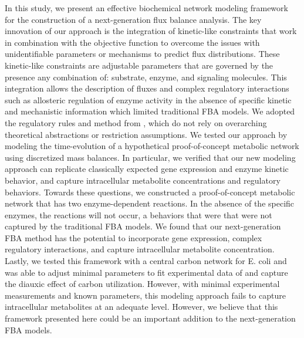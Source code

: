 \documentclass[12pt]{article}
\begin{document}
In this study, we present an effective biochemical network modeling framework for the construction of a next-generation flux balance analysis. The key innovation of our approach is the integration of kinetic-like constraints that work in combination with the objective function to overcome the issues with unidentifiable parameters or mechanisms to predict flux distributions. These kinetic-like constraints are adjustable parameters that are governed by the presence any combination of: substrate, enzyme, and signaling molecules. This integration allows the description of fluxes and complex regulatory interactions such as allosteric regulation of enzyme activity in the absence of specific kinetic and mechanistic information which limited traditional FBA models. We adopted the regulatory rules and method from \cite{wayman2015dynamic}, which do not rely on overarching theoretical abstractions or restriction assumptions. We tested our approach by modeling the time-evolution of a hypothetical proof-of-concept metabolic network using discretized mass balances. In particular, we verified that our new modeling approach can replicate classically expected gene expression and enzyme kinetic behavior, and capture intracellular metabolite concentrations and regulatory behaviors. Towards these questions, we constructed a proof-of-concept metabolic network that has two enzyme-dependent reactions. In the absence of the specific enzymes, the reactions will not occur, a behaviors that were   that were not captured by the traditional FBA models. We found that our next-generation FBA method has the potential to incorporate gene expression, complex regulatory interactions, and capture intracellular metabolite concentration. Lastly, we tested this framework with a central carbon network for E. coli and was able to adjust minimal parameters to fit experimental data of \cite{varma1994stoichiometric} and capture the diauxic effect of carbon utilization. However, with minimal experimental measurements and known parameters, this modeling approach fails to capture intracellular metabolites at an adequate level. However, we believe that this framework presented here could be an important addition to the next-generation FBA models. 

\end{document}
